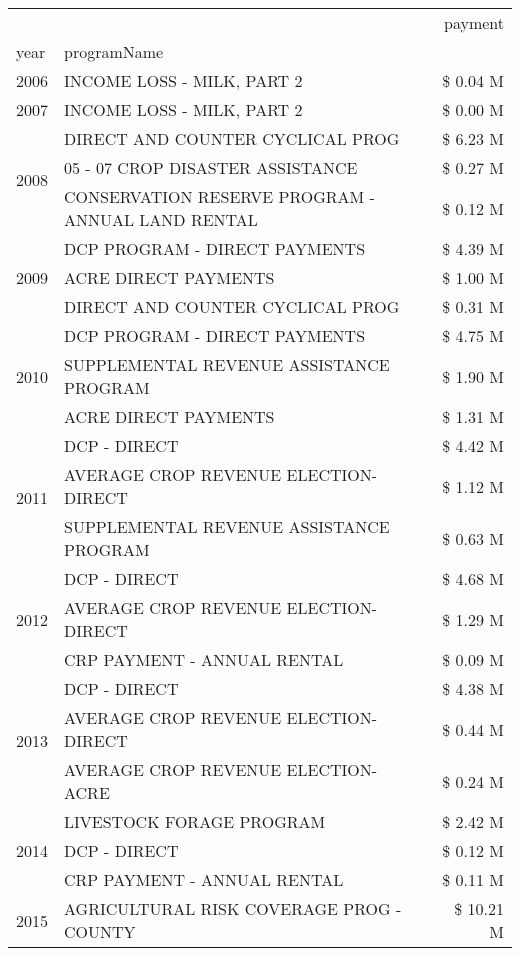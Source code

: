 \begin{tabular}{llr}
\toprule
 &  & payment \\
year & programName &  \\
\midrule
2006 & INCOME LOSS - MILK, PART 2 & \$ 0.04 M \\
\cline{1-3}
2007 & INCOME LOSS - MILK, PART 2 & \$ 0.00 M \\
\cline{1-3}
\multirow[t]{3}{*}{2008} & DIRECT AND COUNTER CYCLICAL PROG & \$ 6.23 M \\
 & 05 - 07 CROP DISASTER ASSISTANCE & \$ 0.27 M \\
 & CONSERVATION RESERVE PROGRAM - ANNUAL LAND RENTAL & \$ 0.12 M \\
\cline{1-3}
\multirow[t]{3}{*}{2009} & DCP PROGRAM - DIRECT PAYMENTS & \$ 4.39 M \\
 & ACRE DIRECT PAYMENTS & \$ 1.00 M \\
 & DIRECT AND COUNTER CYCLICAL PROG & \$ 0.31 M \\
\cline{1-3}
\multirow[t]{3}{*}{2010} & DCP PROGRAM - DIRECT PAYMENTS & \$ 4.75 M \\
 & SUPPLEMENTAL REVENUE ASSISTANCE PROGRAM & \$ 1.90 M \\
 & ACRE DIRECT PAYMENTS & \$ 1.31 M \\
\cline{1-3}
\multirow[t]{3}{*}{2011} & DCP - DIRECT & \$ 4.42 M \\
 & AVERAGE CROP REVENUE ELECTION-DIRECT & \$ 1.12 M \\
 & SUPPLEMENTAL REVENUE ASSISTANCE PROGRAM & \$ 0.63 M \\
\cline{1-3}
\multirow[t]{3}{*}{2012} & DCP - DIRECT & \$ 4.68 M \\
 & AVERAGE CROP REVENUE ELECTION-DIRECT & \$ 1.29 M \\
 & CRP PAYMENT - ANNUAL RENTAL & \$ 0.09 M \\
\cline{1-3}
\multirow[t]{3}{*}{2013} & DCP - DIRECT & \$ 4.38 M \\
 & AVERAGE CROP REVENUE ELECTION-DIRECT & \$ 0.44 M \\
 & AVERAGE CROP REVENUE ELECTION-ACRE & \$ 0.24 M \\
\cline{1-3}
\multirow[t]{3}{*}{2014} & LIVESTOCK FORAGE PROGRAM & \$ 2.42 M \\
 & DCP - DIRECT & \$ 0.12 M \\
 & CRP PAYMENT - ANNUAL RENTAL & \$ 0.11 M \\
\cline{1-3}
\multirow[t]{3}{*}{2015} & AGRICULTURAL RISK COVERAGE PROG - COUNTY & \$ 10.21 M \\

\end{tabular}
